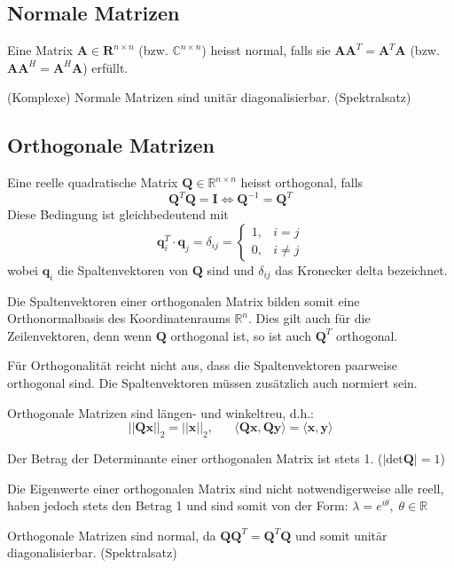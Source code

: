 \documentclass[11pt]{article}
\begin{document}
\subsection*{Normale Matrizen}
\vspace*{-0.5cm}
Eine Matrix $\mathbf{A} \in \mathbf{R}^{n\times n}$ (bzw. $\mathbb{C}^{n \times n}$) heisst normal, falls sie $\mathbf{AA}^T = \mathbf{A}^T \mathbf{A}$ (bzw. $\mathbf{AA}^H = \mathbf{A}^H \mathbf{A}$) erfüllt.

(Komplexe) Normale Matrizen sind unitär diagonalisierbar. (Spektralsatz)

\subsection*{Orthogonale Matrizen}
\vspace*{-0.5cm}
Eine reelle quadratische Matrix $\mathbf{Q} \in \mathbb{R}^{n \times n}$ heisst orthogonal, falls
$$\mathbf{Q}^T \mathbf{Q}= \mathbf{I} \Leftrightarrow \mathbf{Q}^{-1} = \mathbf{Q}^T$$
Diese Bedingung ist gleichbedeutend mit $$\mathbf{q}_i^T \cdot \mathbf{q}_j = \delta_{ij} = \begin{cases}
    1, & i = j \\
    0, & i \neq j
\end{cases}$$
wobei $\mathbf{q}_i$ die Spaltenvektoren von $\mathbf{Q}$ sind und $\delta_{ij}$ das Kronecker delta bezeichnet.

Die Spaltenvektoren einer orthogonalen Matrix bilden somit eine Orthonormalbasis des Koordinatenraums $\mathbb{R}^n$. Dies gilt auch für die Zeilenvektoren, denn wenn $\mathbf{Q}$ orthogonal ist, so ist auch $\mathbf{Q}^T$ orthogonal.

Für Orthogonalität reicht nicht aus, dass die Spaltenvektoren paarweise orthogonal sind. Die Spaltenvektoren müssen zusätzlich auch normiert sein.

Orthogonale Matrizen sind längen- und winkeltreu, d.h.:
$$||\mathbf{Qx}||_2 = ||\mathbf{x}||_2, \hspace{20pt} \langle \mathbf{Qx}, \mathbf{Qy} \rangle = \langle \mathbf{x}, \mathbf{y}\rangle$$

Der Betrag der Determinante einer orthogonalen Matrix ist stets 1. ($|\text{det}\mathbf{Q}| = 1$)

Die Eigenwerte einer orthogonalen Matrix sind nicht notwendigerweise alle reell, haben jedoch stets den Betrag 1 und sind somit von der Form: $\lambda = e^{i\theta}, \; \theta \in \mathbb{R}$

Orthogonale Matrizen sind normal, da $\mathbf{QQ}^T = \mathbf{Q}^T \mathbf{Q}$ und somit unitär diagonalisierbar. (Spektralsatz)
\end{document}
